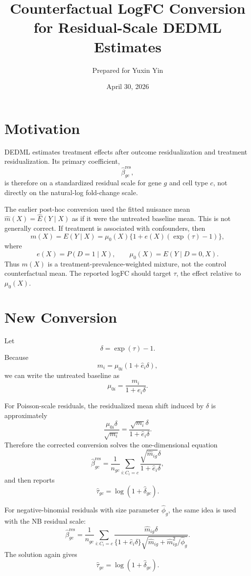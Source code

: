 \documentclass[11pt]{article}
\title{\textbf{Counterfactual LogFC Conversion for Residual-Scale DEDML Estimates}}
\author{Prepared for Yuxin Yin}
\date{April 30, 2026}
\begin{document}
\maketitle

\section*{Motivation}

DEDML estimates treatment effects after outcome residualization and treatment
residualization. Its primary coefficient,
\[
  \widehat{\beta}_{gc}^{\mathrm{res}},
\]
is therefore on a standardized residual scale for gene \(g\) and cell type
\(c\), not directly on the natural-log fold-change scale.

The earlier post-hoc conversion used the fitted nuisance mean
\(\widehat m(X)=\widehat E(Y\mid X)\) as if it were the untreated baseline
mean. This is not generally correct. If treatment is associated with
confounders, then
\[
  m(X)
  =
  E(Y\mid X)
  =
  \mu_0(X)\{1+e(X)(\exp(\tau)-1)\},
\]
where
\[
  e(X)=P(D=1\mid X),
  \qquad
  \mu_0(X)=E(Y\mid D=0,X).
\]
Thus \(m(X)\) is a treatment-prevalence-weighted mixture, not the control
counterfactual mean. The reported logFC should target \(\tau\), the effect
relative to \(\mu_0(X)\).

\section*{New Conversion}

Let
\[
  \delta=\exp(\tau)-1.
\]
Because
\[
  m_i = \mu_{0i}(1+\widehat e_i\delta),
\]
we can write the untreated baseline as
\[
  \mu_{0i} = \frac{m_i}{1+\widehat e_i\delta}.
\]

For Poisson-scale residuals, the residualized mean shift induced by \(\delta\)
is approximately
\[
  \frac{\mu_{0i}\delta}{\sqrt{m_i}}
  =
  \frac{\sqrt{m_i}\delta}{1+\widehat e_i\delta}.
\]
Therefore the corrected conversion solves the one-dimensional equation
\[
  \widehat{\beta}_{gc}^{\mathrm{res}}
  =
  \frac{1}{n_{gc}}
  \sum_{i:C_i=c}
  \frac{\sqrt{\widehat m_{ig}}\delta}
       {1+\widehat e_i\delta},
\]
and then reports
\[
  \widehat\tau_{gc} = \log(1+\widehat\delta_{gc}).
\]

For negative-binomial residuals with size parameter \(\widehat\phi_g\), the
same idea is used with the NB residual scale:
\[
  \widehat{\beta}_{gc}^{\mathrm{res}}
  =
  \frac{1}{n_{gc}}
  \sum_{i:C_i=c}
  \frac{
    \widehat m_{ig}\delta
  }{
    \{1+\widehat e_i\delta\}
    \sqrt{\widehat m_{ig}+\widehat m_{ig}^2/\widehat\phi_g}
  }.
\]
The solution again gives
\[
  \widehat\tau_{gc} = \log(1+\widehat\delta_{gc}).
\]
\end{document}
